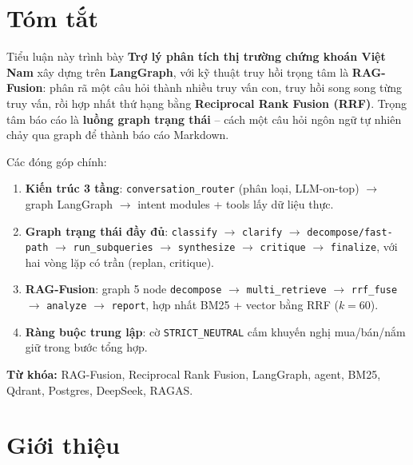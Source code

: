 \documentclass[12pt, a4paper]{report}
\begin{document}
\chapter*{Tóm tắt}

Tiểu luận này trình bày \textbf{Trợ lý phân tích thị trường chứng khoán Việt Nam} xây dựng trên \textbf{LangGraph}, với kỹ thuật truy hồi trọng tâm là \textbf{RAG-Fusion}: phân rã một câu hỏi thành nhiều truy vấn con, truy hồi song song từng truy vấn, rồi hợp nhất thứ hạng bằng \textbf{Reciprocal Rank Fusion (RRF)}. Trọng tâm báo cáo là \textbf{luồng graph trạng thái} -- cách một câu hỏi ngôn ngữ tự nhiên chảy qua graph để thành báo cáo Markdown.

\medskip\noindent Các đóng góp chính:
\begin{enumerate}
  \item \textbf{Kiến trúc 3 tầng}: \texttt{conversation\_router} (phân loại, LLM-on-top) $\rightarrow$ graph LangGraph $\rightarrow$ intent modules + tools lấy dữ liệu thực.
  \item \textbf{Graph trạng thái đầy đủ}: \texttt{classify} $\rightarrow$ \texttt{clarify} $\rightarrow$ \texttt{decompose/fast-path} $\rightarrow$ \texttt{run\_subqueries} $\rightarrow$ \texttt{synthesize} $\rightarrow$ \texttt{critique} $\rightarrow$ \texttt{finalize}, với hai vòng lặp có trần (replan, critique).
  \item \textbf{RAG-Fusion}: graph 5 node \texttt{decompose} $\rightarrow$ \texttt{multi\_retrieve} $\rightarrow$ \texttt{rrf\_fuse} $\rightarrow$ \texttt{analyze} $\rightarrow$ \texttt{report}, hợp nhất BM25 + vector bằng RRF ($k=60$).
  \item \textbf{Ràng buộc trung lập}: cờ \texttt{STRICT\_NEUTRAL} cấm khuyến nghị mua/bán/nắm giữ trong bước tổng hợp.
\end{enumerate}

\medskip\noindent\textbf{Từ khóa:} RAG-Fusion, Reciprocal Rank Fusion, LangGraph, agent, BM25, Qdrant, Postgres, DeepSeek, RAGAS.

\newpage

\chapter{Giới thiệu}
\end{document}
